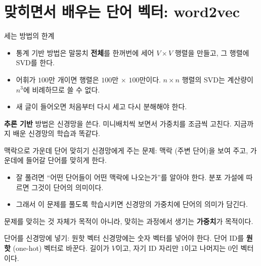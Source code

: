 \documentclass[aspectratio=169,11pt]{beamer}
\begin{document}
\section{맞히면서 배우는 단어 벡터: word2vec}

\begin{frame}{세는 방법의 한계}
\begin{itemize}
\item 통계 기반 방법은 말뭉치 \textbf{전체}를 한꺼번에 세어 $V\times V$ 행렬을 만들고, 그 행렬에 SVD를 한다.
\item 어휘가 $100$만 개이면 행렬은 $100$만 $\times$ $100$만이다.
$n\times n$ 행렬의 SVD는 계산량이 $n^3$에 비례하므로 쓸 수 없다.
\item 새 글이 들어오면 처음부터 다시 세고 다시 분해해야 한다.
\end{itemize}
\textbf{추론 기반} 방법은 신경망을 쓴다. 미니배치씩 보면서 가중치를 조금씩 고친다.
지금까지 배운 신경망의 학습과 똑같다.
\end{frame}

\begin{frame}{맥락으로 가운데 단어 맞히기}
신경망에게 주는 문제: 맥락 (주변 단어)을 보여 주고, 가운데에 들어갈 단어를 맞히게 한다.
\begin{itemize}
\item 잘 풀려면 ``어떤 단어들이 어떤 맥락에 나오는가''를 알아야 한다. 분포 가설에 따르면 그것이 단어의 의미이다.
\item 그래서 이 문제를 풀도록 학습시키면 신경망의 가중치에 단어의 의미가 담긴다.
\end{itemize}
\begin{keybox}
문제를 맞히는 것 자체가 목적이 아니라, 맞히는 과정에서 생기는 \textbf{가중치}가 목적이다.
\end{keybox}
\end{frame}

\begin{frame}{단어를 신경망에 넣기: 원핫 벡터}
신경망에는 숫자 벡터를 넣어야 한다. 단어 ID를 \textbf{원핫} (one-hot) 벡터로 바꾼다.
길이가 $V$이고, 자기 ID 자리만 $1$이고 나머지는 $0$인 벡터이다.
\vskip2mm
\end{frame}
\end{document}
